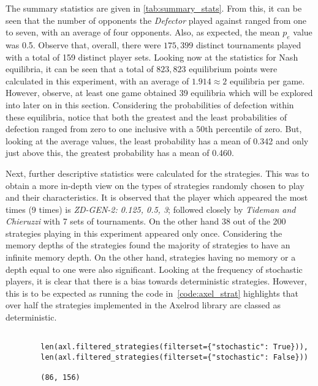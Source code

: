 The summary statistics are given in \autoref{tab:summary_stats}. From this, it can be
seen that the number of opponents the \textit{Defector} played against ranged
from one to seven, with an average of four opponents. Also, as expected, the
mean \(p_{e}\) value was 0.5. Observe that, overall,
there were \(175,399\) distinct tournaments played with a total of 159 distinct
player sets. 
Looking now at the statistics for Nash equilibria, it can be seen that a total
of \(823,823\) equilibrium points were calculated in this experiment, with an
average of \(1.914 \approx 2\) equilibria per game. However, observe, at least
one game obtained 39 equilibria which will be explored into later on in this
section. Considering the probabilities of defection within these equilibria,
notice that both the greatest and the least probabilities of defection ranged
from zero to one inclusive with a \(50\)th percentile of zero. But, looking at
the average values, the least probability has a mean of 0.342 and only just
above this, the greatest probability has a mean of 0.460.

Next, further descriptive statistics were calculated for the strategies. This was
to obtain a more in-depth view on the types of strategies randomly chosen to
play and their characteristics. It is observed that the player which appeared the most
times (9 times) is \textit{ZD-GEN-2: 0.125, 0.5, 3}; followed closely by
\textit{Tideman and Chieruzzi} with 7 sets of tournaments. On the other hand 38
out of the 200 strategies playing in this experiment appeared only once.
Considering the memory
depths of the strategies found the majority of strategies to have an infinite
memory depth. On the other hand, strategies having no memory or a depth equal to
one were also significant. Looking at the frequency of stochastic players,
it is clear that there is a bias towards deterministic strategies. However, this
is to be expected as running the code in~\autoref{code:axel_strat} highlights
that over half the strategies implemented in the Axelrod library are
classed as deterministic.

\begin{listing}
    \begin{verbatim}
    
        len(axl.filtered_strategies(filterset={"stochastic": True})), 
        len(axl.filtered_strategies(filterset={"stochastic": False}))

        (86, 156)
    \end{verbatim}
\end{listing}\label{code:axel_strat}

